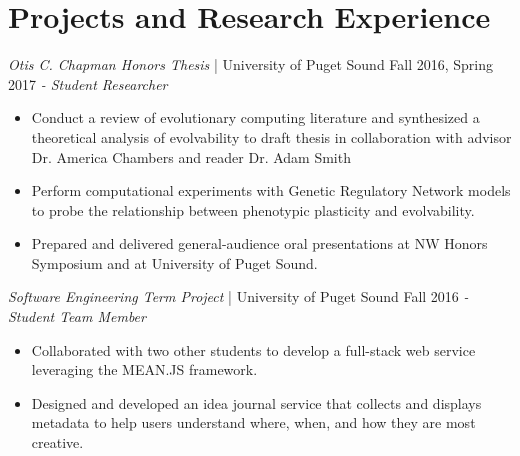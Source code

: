 \section{Projects and Research Experience}

\textit{Otis C. Chapman Honors Thesis} | University of Puget Sound \hfill Fall 2016, Spring 2017 \newline 
\textit{- Student Researcher} \\
  \vspace{-4.5mm}
 \begin{itemize}
 \item Conduct a review of evolutionary computing literature and synthesized a theoretical analysis of evolvability to draft thesis in collaboration with advisor Dr. America Chambers and reader Dr. Adam Smith
 \item Perform computational experiments with Genetic Regulatory Network models to probe the relationship between phenotypic plasticity and evolvability.
 \item Prepared and delivered general-audience oral presentations at NW Honors Symposium and at University of Puget Sound.
 \end{itemize}
  \vspace{-3.5mm}
  
\textit{Software Engineering Term Project} | University of Puget Sound \hfill Fall 2016 \newline 
\textit{- Student Team Member} \\
  \vspace{-4.5mm}
 \begin{itemize}
 \item Collaborated with two other students to develop a full-stack web service leveraging the MEAN.JS framework.
 \item Designed and developed an idea journal service that collects and displays metadata to help users understand where, when, and how they are most creative.
 \end{itemize}
  \vspace{-3.5mm}  


